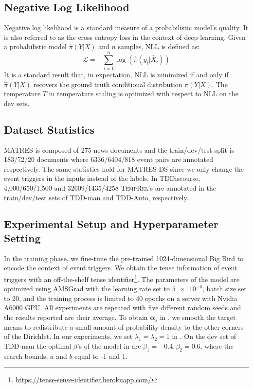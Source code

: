 \documentclass[11pt]{article}
\newcommand{\temprel}{\textsc{TempRel}\xspace}
\newcommand{\scrL}{\mathcal{L}}
\newcommand{\xb}{\bar{X}}
\begin{document}
\subsection{Negative Log Likelihood}
\label{sec:nll}
Negative log likelihood is a standard measure of a probabilistic model's quality. It is also referred to as the cross entropy loss in the context of deep learning. Given a probabilistic model $\hat{\pi}(Y|X)$ and $n$ samples, NLL is defined as:
\begin{equation}
  \scrL = -\sum_{i=1}^{n}\log(\hat{\pi}(y_i|\xb_i))
\end{equation}
It is a standard result that, in expectation, NLL is minimized if and only if $\hat{\pi}(Y|X)$ recovers the ground truth conditional distribution $\pi(Y|X)$.
The temperature $T$ in temperature scaling is optimized with respect to NLL on the dev sets. 

\subsection{Dataset Statistics}
\label{sec:stats}
MATRES is composed of 275 news documents and the train/dev/test split is 183/72/20 documents where 6336/6404/818 event pairs are annotated respectively.
The same statistics hold for MATRES-DS since we only change the event triggers in the inputs instead of the labels.
In TDDiscourse,
4,000/650/1,500 and 32609/1435/4258 \temprel's are annotated in the train/dev/test sets of TDD-man and TDD-Auto, respectively.


\subsection{Experimental Setup and Hyperparameter Setting}
\label{sec:exp_setup}
In the training phase, we fine-tune the pre-trained 1024-dimensional Big Bird \cite{zaheer2020big} to encode the context of event triggers.
We obtain the tense information of event triggers with an off-the-shelf tense identifier\footnote{\url{https://tense-sense-identifier.herokuapp.com/}}.
The parameters of the model are optimized using AMSGrad \cite{reddi2018convergence} with the learning rate set to $\num{5e-6}$, batch size set to 20, and the training process is limited to 40 epochs on a server with Nvidia A6000 GPU.
All experiments are repeated with five different random seeds and the results reported are their average.
To obtain $\bm{\alpha}_{s}$ in ,
we smooth the target means to redistribute a small amount of probability density to the other corners of the Dirichlet.
In our experiments, we set $\lambda_1 = \lambda_2 = 1$ in .
On the dev set of TDD-man the optimal $\beta$'s of the model in  are $\beta_1 = -0.4, \beta_2 = 0.6$, where the search bounds, $a$ and $b$ equal to -1 and 1.





 
\end{document}
